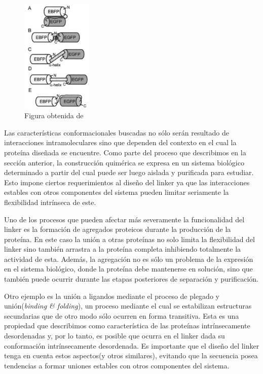 \begin{figure}[htbp]
\centering
\includegraphics[width=0.3\textwidth]{img/conformacionLinker.png} 
\caption{Figura obtenida de \cite{arai2004conformations}}
\label{conformacionLinker}
\end{figure}



Las características conformacionales buscadas no sólo serán resultado de interacciones intramoleculares sino que dependen del contexto en el cual la proteína diseñada se encuentre. 
Como parte del proceso que describimos en la sección anterior, la construcción quimérica se expresa en un sistema biológico determinado a partir del cual puede ser luego aislada y purificada para estudiar. 
Esto impone ciertos requerimientos al diseño del linker ya que las interacciones estables con otros componentes del sistema pueden limitar seriamente la flexibilidad intrínseca de este.

Uno de los procesos que pueden afectar más severamente la funcionalidad del linker es la formación de agregados proteicos durante la producción de la proteína\cite{lebendiker2014production}.
En este caso la unión a otras proteínas no solo limita la flexibilidad del linker sino también arrastra a la proteína completa inhibiendo totalmente la actividad de esta.
Además, la agregación no es sólo un problema de la expresión en el sistema biológico, donde la proteína debe mantenerse en solución,
sino que también puede ocurrir durante las etapas posteriores de separación y purificación.

Otro ejemplo es la unión a ligandos mediante el proceso de plegado y unión(\textit{binding \& folding}), un proceso mediante el cual se estabilizan estructuras secundarias que de otro modo sólo ocurren en forma transitiva.  
Esta es una propiedad que describimos como característica de las proteínas intrínsecamente desordenadas y, por lo tanto, es posible que ocurra en el linker dada su conformación intrínsecamente desordenada.
Es importante que el diseño del linker tenga en cuenta estos aspectos(y otros similares), evitando que la secuencia posea tendencias a formar uniones estables con otros componentes del sistema.


